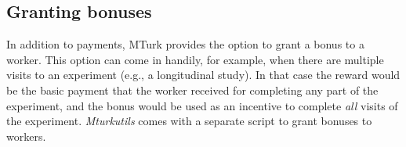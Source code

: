 \documentclass{article}
\begin{document}
\subsection{Granting bonuses}

In addition to payments, MTurk provides the option to grant a bonus to a worker. This option can come in handily, for example, when there are multiple visits to an experiment (e.g., a longitudinal study). In that case the reward would be the basic payment that the worker received for completing any part of the experiment, and the bonus would be used as an incentive to complete {\em all} visits of the experiment. {\em Mturkutils} comes with a separate script to grant bonuses to workers.
\end{document}
